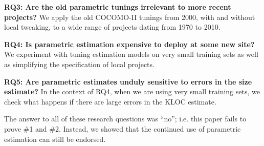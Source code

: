 \documentclass{sig-alternate}
\begin{document}
{\bf RQ3: Are the old parametric tunings irrelevant
  to more recent projects?}  We apply the old
COCOMO-II tunings from 2000, with and without local
tweaking, to a wide range of projects dating from
1970 to 2010.

{\bf RQ4: Is parametric estimation expensive to deploy  at some new site?}
We experiment with tuning estimation models on very small training sets 
as well as simplifying the specification of local projects.

{\bf RQ5: Are parametric estimates unduly sensitive to errors in the size estimate?}
In the context of RQ4, when we are using very small training sets, we check what happens
if there are large errors in the KLOC estimate.

The answer to all of these research questions was
``no''; i.e.   this paper fails to prove \#1 and \#2.
Instead, we showed that
the continued
use of parametric estimation can still be endorsed.
\end{document}
